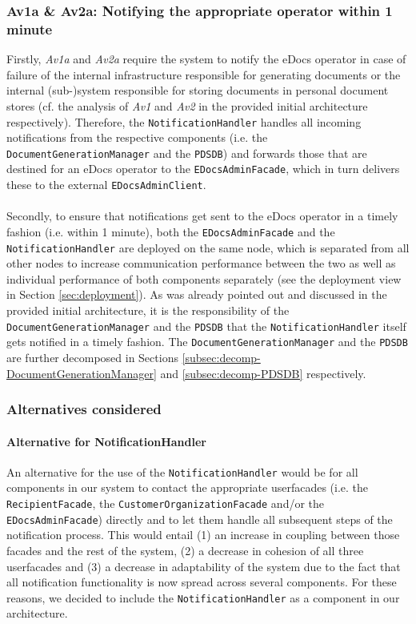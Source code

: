 \documentclass[a4paper,10pt]{article}
\begin{document}
\subsubsection{Av1a \& Av2a: Notifying the appropriate operator within 1 minute}\label{subsubsec:Av1a-Av2a}
Firstly, \textit{Av1a} and \textit{Av2a} require the system to notify the eDocs operator in case of failure of the internal infrastructure responsible for generating documents or the internal (sub-)system responsible for storing documents in personal document stores (cf. the analysis of \textit{Av1} and \textit{Av2} in the provided initial architecture respectively). Therefore, the \texttt{NotificationHandler} handles all incoming notifications from the respective components (i.e. the \texttt{DocumentGenerationManager} and the \texttt{PDSDB}) and forwards those that are destined for an eDocs operator to the \texttt{EDocsAdminFacade}, which in turn delivers these to the external \texttt{EDocsAdminClient}.\\\\
Secondly, to ensure that notifications get sent to the eDocs operator in a timely fashion (i.e. within 1 minute), both the \texttt{EDocsAdminFacade} and the \texttt{NotificationHandler} are deployed on the same node, which is separated from all other nodes to increase communication performance between the two as well as individual performance of both components separately (see the deployment view in Section \ref{sec:deployment}). As was already pointed out and discussed in the provided initial architecture, it is the responsibility of the \texttt{DocumentGenerationManager} and the \texttt{PDSDB} that the \texttt{NotificationHandler} itself gets notified in a timely fashion. The \texttt{DocumentGenerationManager} and the \texttt{PDSDB} are further decomposed in Sections \ref{subsec:decomp-DocumentGenerationManager} and \ref{subsec:decomp-PDSDB} respectively.
\subsubsection*{Alternatives considered}
\paragraph{Alternative for NotificationHandler}
An alternative for the use of the \texttt{NotificationHandler} would be for all components in our system to contact the appropriate userfacades (i.e. the \texttt{RecipientFacade}, the \texttt{CustomerOrganizationFacade} and/or the \texttt{EDocsAdminFacade}) directly and to let them handle all subsequent steps of the notification process. This would entail (1) an increase in coupling between those facades and the rest of the system, (2) a decrease in cohesion of all three userfacades and (3) a decrease in adaptability of the system due to the fact that all notification functionality is now spread across several components. For these reasons, we decided to include the \texttt{NotificationHandler} as a component in our architecture.
\end{document}

